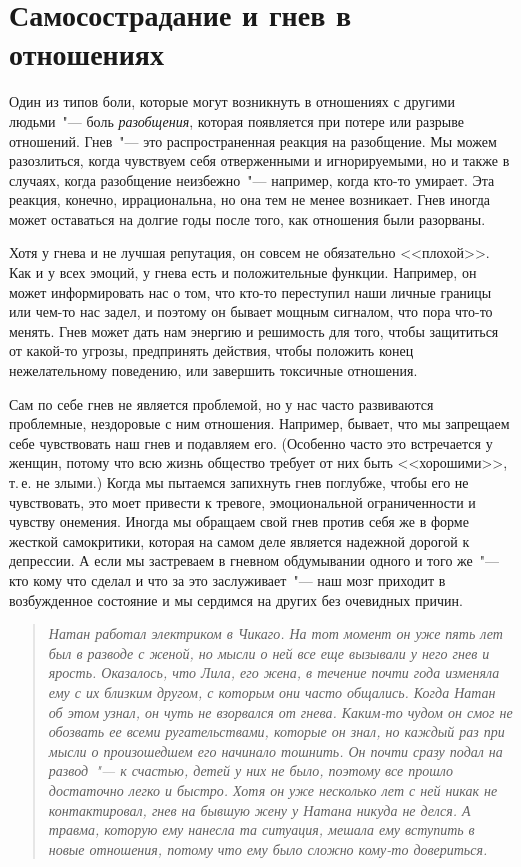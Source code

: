 
\chapter{Самосострадание и гнев в отношениях} \label{Self-Compassion_and_Anger_in_Relationships}

Один из типов боли, которые могут возникнуть в отношениях с другими людьми~"--- боль \emph{разобщения}, которая появляется при потере или разрыве отношений. Гнев~"--- это распространенная реакция на разобщение. Мы можем разозлиться, когда чувствуем себя отверженными и игнорируемыми, но и также в случаях, когда разобщение неизбежно~"--- например, когда кто-то умирает. Эта реакция, конечно, иррациональна, но она тем не менее возникает. Гнев иногда может оставаться на долгие годы после того, как отношения были разорваны.

Хотя у гнева и не лучшая репутация, он совсем не обязательно <<плохой>>. Как и у всех эмоций, у гнева есть и положительные функции. Например, он может информировать нас о том, что кто-то переступил наши личные границы или чем-то нас задел, и поэтому он бывает мощным сигналом, что пора что-то менять. Гнев может дать нам энергию и решимость для того, чтобы защититься от какой-то угрозы, предпринять действия, чтобы положить конец нежелательному поведению, или завершить токсичные отношения.

Сам по себе гнев не является проблемой, но у нас часто развиваются проблемные, нездоровые с ним отношения. Например, бывает, что мы запрещаем себе чувствовать наш гнев и подавляем его. (Особенно часто это встречается у женщин, потому что всю жизнь общество требует от них быть <<хорошими>>, т.\,е. не злыми.) Когда мы пытаемся запихнуть гнев поглубже, чтобы его не чувствовать, это моет привести к тревоге, эмоциональной ограниченности и чувству онемения. Иногда мы обращаем свой гнев против себя же в форме жесткой самокритики, которая на самом деле является надежной дорогой к депрессии. А если мы застреваем в гневном обдумывании одного и того же~"--- кто кому что сделал и что за это заслуживает~"--- наш мозг приходит в возбужденное состояние и мы сердимся на других без очевидных причин. 

\begin{quotation}
	\textit{
		Натан работал электриком в Чикаго. На тот момент он уже пять лет был в разводе с женой, но мысли о ней все еще вызывали у него гнев и ярость. Оказалось, что Лила, его жена, в течение почти года изменяла ему с их близким другом, с которым они часто общались. Когда Натан об этом узнал, он чуть не взорвался от гнева. Каким-то чудом он смог не обозвать ее всеми ругательствами, которые он знал, но каждый раз при мысли о произошедшем его начинало тошнить. Он почти сразу подал на развод~"--- к счастью, детей у них не было, поэтому все прошло достаточно легко и быстро. Хотя он уже несколько лет с ней никак не контактировал, гнев на бывшую жену у Натана никуда не делся. А травма, которую ему нанесла та ситуация, мешала ему вступить в новые отношения, потому что ему было сложно кому-то довериться.
	}
\end{quotation}

